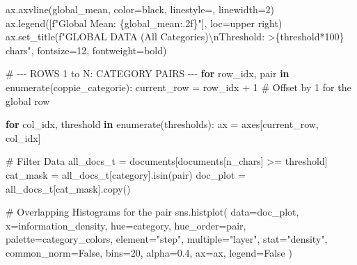 \documentclass[
  italian,
  a4paper,
]{article}
\newenvironment{Shaded}{\begin{snugshade}}{\end{snugshade}}
\newcommand{\BuiltInTok}[1]{\textcolor[rgb]{0.00,0.23,0.31}{#1}}
\newcommand{\CharTok}[1]{\textcolor[rgb]{0.13,0.47,0.30}{#1}}
\newcommand{\CommentTok}[1]{\textcolor[rgb]{0.37,0.37,0.37}{#1}}
\newcommand{\ControlFlowTok}[1]{\textcolor[rgb]{0.00,0.23,0.31}{\textbf{#1}}}
\newcommand{\DecValTok}[1]{\textcolor[rgb]{0.68,0.00,0.00}{#1}}
\newcommand{\FloatTok}[1]{\textcolor[rgb]{0.68,0.00,0.00}{#1}}
\newcommand{\KeywordTok}[1]{\textcolor[rgb]{0.00,0.23,0.31}{\textbf{#1}}}
\newcommand{\NormalTok}[1]{\textcolor[rgb]{0.00,0.23,0.31}{#1}}
\newcommand{\OperatorTok}[1]{\textcolor[rgb]{0.37,0.37,0.37}{#1}}
\newcommand{\SpecialCharTok}[1]{\textcolor[rgb]{0.37,0.37,0.37}{#1}}
\newcommand{\SpecialStringTok}[1]{\textcolor[rgb]{0.13,0.47,0.30}{#1}}
\newcommand{\StringTok}[1]{\textcolor[rgb]{0.13,0.47,0.30}{#1}}
\newcommand{\VariableTok}[1]{\textcolor[rgb]{0.07,0.07,0.07}{#1}}
\begin{document}
\begin{Shaded}
\begin{Highlighting}[]
\NormalTok{    ax.axvline(global\_mean, color}\OperatorTok{=}\StringTok{\textquotesingle{}black\textquotesingle{}}\NormalTok{, linestyle}\OperatorTok{=}\StringTok{\textquotesingle{}{-}\textquotesingle{}}\NormalTok{, linewidth}\OperatorTok{=}\DecValTok{2}\NormalTok{)}
\NormalTok{    ax.legend([}\SpecialStringTok{f"Global Mean: }\SpecialCharTok{\{}\NormalTok{global\_mean}\SpecialCharTok{:.2f\}}\SpecialStringTok{"}\NormalTok{], loc}\OperatorTok{=}\StringTok{\textquotesingle{}upper right\textquotesingle{}}\NormalTok{)}
\NormalTok{    ax.set\_title(}\SpecialStringTok{f"GLOBAL DATA (All Categories)}\CharTok{\textbackslash{}n}\SpecialStringTok{Threshold: \textgreater{}}\SpecialCharTok{\{}\NormalTok{threshold}\OperatorTok{*}\DecValTok{100}\SpecialCharTok{\}}\SpecialStringTok{ chars"}\NormalTok{, fontsize}\OperatorTok{=}\DecValTok{12}\NormalTok{, fontweight}\OperatorTok{=}\StringTok{\textquotesingle{}bold\textquotesingle{}}\NormalTok{)}

\CommentTok{\# {-}{-}{-} ROWS 1 to N: CATEGORY PAIRS {-}{-}{-}}
\ControlFlowTok{for}\NormalTok{ row\_idx, pair }\KeywordTok{in} \BuiltInTok{enumerate}\NormalTok{(coppie\_categorie):}
\NormalTok{    current\_row }\OperatorTok{=}\NormalTok{ row\_idx }\OperatorTok{+} \DecValTok{1} \CommentTok{\# Offset by 1 for the global row}
    
    \ControlFlowTok{for}\NormalTok{ col\_idx, threshold }\KeywordTok{in} \BuiltInTok{enumerate}\NormalTok{(thresholds):}
\NormalTok{        ax }\OperatorTok{=}\NormalTok{ axes[current\_row, col\_idx]}

        \CommentTok{\# Filter Data}
\NormalTok{        all\_docs\_t }\OperatorTok{=}\NormalTok{ documents[documents[}\StringTok{\textquotesingle{}n\_chars\textquotesingle{}}\NormalTok{] }\OperatorTok{\textgreater{}=}\NormalTok{ threshold]}
\NormalTok{        cat\_mask }\OperatorTok{=}\NormalTok{ all\_docs\_t[}\StringTok{\textquotesingle{}category\textquotesingle{}}\NormalTok{].isin(pair)}
\NormalTok{        doc\_plot }\OperatorTok{=}\NormalTok{ all\_docs\_t[cat\_mask].copy()}
        
        \CommentTok{\# Overlapping Histograms for the pair}
\NormalTok{        sns.histplot(}
\NormalTok{            data}\OperatorTok{=}\NormalTok{doc\_plot, x}\OperatorTok{=}\StringTok{\textquotesingle{}information\_density\textquotesingle{}}\NormalTok{, hue}\OperatorTok{=}\StringTok{\textquotesingle{}category\textquotesingle{}}\NormalTok{, }
\NormalTok{            hue\_order}\OperatorTok{=}\NormalTok{pair, palette}\OperatorTok{=}\NormalTok{category\_colors,}
\NormalTok{            element}\OperatorTok{=}\StringTok{"step"}\NormalTok{, multiple}\OperatorTok{=}\StringTok{"layer"}\NormalTok{, stat}\OperatorTok{=}\StringTok{"density"}\NormalTok{,     }
\NormalTok{            common\_norm}\OperatorTok{=}\VariableTok{False}\NormalTok{, bins}\OperatorTok{=}\DecValTok{20}\NormalTok{, alpha}\OperatorTok{=}\FloatTok{0.4}\NormalTok{, ax}\OperatorTok{=}\NormalTok{ax, legend}\OperatorTok{=}\VariableTok{False}
\NormalTok{        )}


\end{Highlighting}
\end{Shaded}
\end{document}
